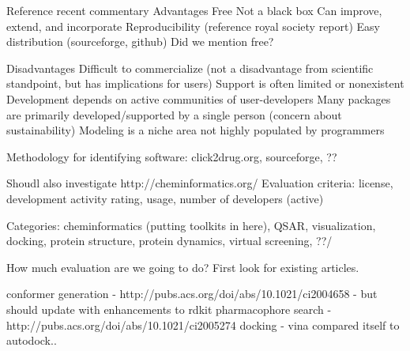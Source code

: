 Reference recent commentary \cite{Karthikeyan_2014}\cite{Gezelter_2015}\cite{Krylov_2015}
Advantages 
Free
Not a black box 
Can improve, extend, and incorporate
Reproducibility (reference royal society report)
Easy distribution (sourceforge, github)
Did we mention free?

Disadvantages
Difficult to commercialize (not a disadvantage from scientific standpoint, but has implications for users)
Support is often limited or nonexistent 
Development depends on active communities of user-developers 
Many packages are primarily developed/supported by a single person (concern about sustainability)
Modeling is a niche area not highly populated by programmers

Methodology for identifying software: click2drug.org, sourceforge, ??

Shoudl also investigate http://cheminformatics.org/
Evaluation criteria: license, development activity rating, usage, number of developers (active)

Categories:
 cheminformatics (putting toolkits in here), QSAR, visualization, docking, protein structure, protein dynamics, virtual screening, ??/
 
 
 How much evaluation are we going to do?  First look for existing articles.
 
 conformer generation - http://pubs.acs.org/doi/abs/10.1021/ci2004658 - but should update with enhancements to rdkit
 pharmacophore search - http://pubs.acs.org/doi/abs/10.1021/ci2005274
 docking - vina compared itself to autodock..
  
  
  \cite{Koes_2011}
  